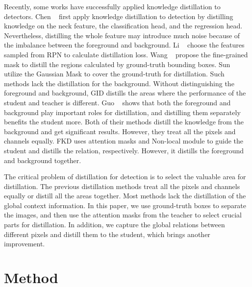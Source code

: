 \documentclass[10pt,twocolumn,letterpaper]{article}
\begin{document}
Recently, some works have successfully applied knowledge distillation to detectors. Chen \etal~\cite{chen2017learning} first apply knowledge distillation to detection by distilling knowledge on the neck feature, the classification head, and the regression head. Nevertheless, distilling the whole feature may introduce much noise because of the imbalance between the foreground and background. Li \etal~\cite{li2017mimicking} choose the features sampled from RPN to calculate distillation loss. Wang \etal~\cite{wang2019distilling} propose the fine-grained mask to distill the regions calculated by ground-truth bounding boxes. Sun \etal~\cite{sun2020distilling} utilize the Gaussian Mask to cover the ground-truth for distillation. Such methods lack the distillation for the background. Without distinguishing the foreground and background, GID\cite{dai2021general} distills the areas where the performance of the student and teacher is different. Guo \etal~\cite{guo2021distilling} shows that both the foreground and background play important roles for distillation, and distilling them separately benefits the student more. Both of their methods distill the knowledge from the background and get significant results. However, they treat all the pixels and channels equally. FKD\cite{zhang2020improve} uses attention masks and Non-local module\cite{wang2018non} to guide the student and distills the relation, respectively. However, it distills the foreground and background together.

The critical problem of distillation for detection is to select the valuable area for distillation. The previous distillation methods treat all the pixels and channels equally\cite{wang2019distilling,sun2020distilling,dai2021general,guo2021distilling} or distill all the areas\cite{zhang2020improve} together. Most methods lack the distillation of the global context information. In this paper, we use ground-truth boxes to separate the images, and then use the attention masks from the teacher to select crucial parts for distillation. In addition, we capture the global relations between different pixels and distill them to the student, which brings another improvement.

\section{Method}
\label{sec:method}
\end{document}
